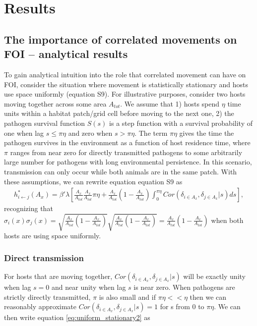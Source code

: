 \documentclass[letterpaper]{article}
\begin{document}
\section*{Results}

\subsection*{The importance of correlated movements on FOI -- analytical results}

To gain analytical intuition into the role that correlated movement can have on FOI, consider the situation where movement is statistically stationary and hosts use space uniformly (equation S9). 
For illustrative purposes, consider two hosts moving together across some area $A_{tot}$. We assume that 1) hosts spend $\eta$ time units within a habitat patch/grid cell before moving to the next one, 2) the pathogen survival function $S(s)$ is a step function with a survival probability of one when lag $s \leq \pi \eta$ and zero when $s > \pi \eta$.  
The term $\pi \eta$ gives the time the pathogen survives in the environment as a function of host residence time, where $\pi$ ranges from near zero for directly transmitted pathogens to some arbitrarily large number for pathogens with long environmental persistence.  
In this scenario, transmission can only occur while both animals are in the same patch. With these assumptions, we can rewrite equation equation S9 as 
\begin{equation}
    \begin{aligned}
        h^*_{i \leftarrow j}(A_x) = \beta' \lambda \left[\frac{A_x}{A_{tot}}\frac{A_x}{A_{tot}} \pi \eta + \frac{A_x}{A_{tot}}(1 - \frac{A_x}{A_{tot}}) \int_{0}^{\pi \eta} Cor(\delta_{i \in A_x}, \delta_{j \in A_x} | s) ds\right],
    \end{aligned}
    \label{eq:uniform_stationary2}
\end{equation}
recognizing that $\sigma_i(x) \sigma_j(x) = \sqrt{\frac{A_x}{A_{tot}}(1 - \frac{A_x}{A_{tot}})}\sqrt{\frac{A_x}{A_{tot}}(1 - \frac{A_x}{A_{tot}})} = \frac{A_x}{A_{tot}}(1 - \frac{A_x}{A_{tot}})$ when both hosts are using space uniformly.

\subsubsection*{Direct transmission}

For hosts that are moving together, $Cor(\delta_{i \in A_x}, \delta_{j \in A_x} | s)$ will be exactly unity when lag $s = 0$ and near unity when lag $s$ is near zero. When pathogens are strictly directly transmitted, $\pi$ is also small and if $\pi \eta << \eta$ then we can reasonably approximate $Cor(\delta_{i \in A_x}, \delta_{j \in A_x} | s) = 1$ for s from 0 to $\pi \eta$.  We can then write equation \ref{eq:uniform_stationary2} as 
\end{document}
